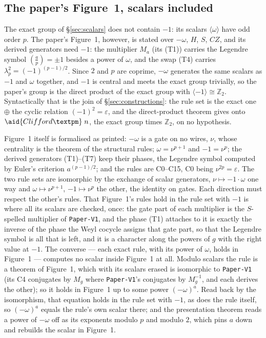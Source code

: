 \subsection{The paper's Figure~1, scalars included}\label{sec:figure1}

The exact group of \S\ref{sec:scalars} does not contain $-1$: its
scalars $\langle\omega\rangle$ have odd order $p$.  The paper's
Figure~1, however, is stated over $-\omega$, $H$, $S$, $CZ$, and its
derived generators need $-1$: the multiplier $M_a$ (its (T1)) carries
the Legendre symbol $(\frac{a}{p}) = \pm 1$ besides a power of $\omega$,
and the swap (T4) carries $\lambda_p^2 = (-1)^{(p-1)/2}$.  Since $2$ and
$p$ are coprime, $-\omega$ generates the same scalars as $-1$ and
$\omega$ together, and $-1$ is central and meets the exact group
trivially, so the paper's group is the direct product of the exact
group with $\langle -1\rangle \cong \mathbb Z_2$.  Syntactically that is
the join of \S\ref{sec:constructions}: the rule set
 is the exact one $\oplus$ the cyclic relation
$(-1)^2 = \varepsilon$, and the direct-product theorem gives
 onto $\aid{Clifford±}\;n$, the exact group
times $\mathbb Z_2$, on no hypothesis.

Figure~1 itself is formalised as printed: $-\omega$ is a gate on no
wires, $\nu$, whose centrality is the theorem  of the
structural rules; $\omega = \nu^{p+1}$ and $-1 = \nu^{p}$; the derived
generators (T1)--(T7) keep their phases, the Legendre symbol computed by
Euler's criterion $a^{(p-1)/2}$; and the rules are C0--C15, C0 being
$\nu^{2p} = \varepsilon$.  The two rule sets are isomorphic by the
exchange of scalar generators, $\nu \mapsto -1 \cdot \omega$ one way and
$\omega \mapsto \nu^{p+1}$, $-1 \mapsto \nu^{p}$ the other, the identity
on gates.  Each direction must respect the other's rules.  That
Figure~1's rules hold in the rule set with $-1$ is where all its
scalars are checked, once: the gate part of each multiplier is the
$S$-spelled multiplier of \texttt{Paper-V1}, and the phase (T1) attaches
to it is exactly the inverse of the phase the Weyl cocycle assigns that
gate part, so that the Legendre symbol is all that is left, and it is a
character along the powers of $g$ with the right value at $-1$.  The
converse --- each exact rule, with its power of $\omega$, holds in
Figure~1 --- computes no scalar inside Figure~1 at all.  Modulo scalars
the rule is a theorem of Figure~1, which with its scalars erased is
isomorphic to \texttt{Paper-V1} (its C4 conjugates by $M_g$ where
\texttt{Paper-V1}'s  conjugates by $M_g^{-1}$, and each
derives the other); so it holds in Figure~1 up to some power
$(-\omega)^a$.  Read back by the isomorphism, that equation holds in the
rule set with $-1$, as does the rule itself, so $(-\omega)^a$ equals the
rule's own scalar there; and the presentation theorem reads a power of
$-\omega$ off as its exponents modulo $p$ and modulo $2$, which pins
$a$ down and rebuilds the scalar in Figure~1.

